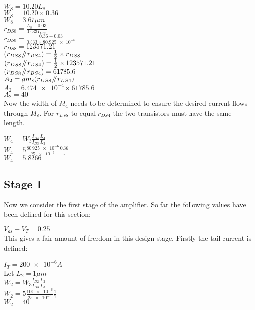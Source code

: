 $W_{8} = 10.20L_{8}$ \\
$W_{8} = 10.20 \times 0.36$ \\
$W_{8} = 3.67\mu m$ \\

$r_{DS8} = \frac{L_{8} - 0.03}{0.033I_{DS8}}$ \\
$r_{DS8} = \frac{0.36 - 0.03}{0.033 \times \num{80.925e-6}}$ \\
$r_{DS8} = 123571.21$ \\

$(r_{DS8} \mathbin{\!/\mkern-5mu/\!} r_{DS4}) = \frac{1}{2} \times r_{DS8}$ \\
$(r_{DS8} \mathbin{\!/\mkern-5mu/\!} r_{DS4}) = \frac{1}{2} \times 123571.21$ \\
$(r_{DS8} \mathbin{\!/\mkern-5mu/\!} r_{DS4}) = 61785.6$ \\

$A_{2} = gm_{8}(r_{DS8} \mathbin{\!/\mkern-5mu/\!} r_{DS4})$ \\
$A_{2} = \num{6.474e-4} \times 61785.6$ \\
$A_{2} = 40$ \\

Now the width of $M_{4}$ needs to be determined to ensure the desired current flows through $M_{8}$.
For $r_{DS8}$ to equal $r_{DS4}$ the two transistors must have the same length.

$W_{4} = W_{3}\frac{I_{D4}}{I_{D3}}\frac{L_{4}}{L_{3}}$ \\
$W_{4} = 5\frac{\num{80.925e-6}}{\num{25e-6}}\frac{0.36}{1}$ \\
$W_{4} = 5.8266$ \\

\subsection{Stage 1}
Now we consider the first stage of the amplifier.
So far the following values have been defined for this section:

$V_{gs} - V_{T} = 0.25$ \\

This gives a fair amount of freedom in this design stage.
Firstly the tail current is defined:

$I_{T} = \num{200e-6}A$ \\

Let $L_{2} = 1\mu m$ \\

$W_{2} = W_{3}\frac{I_{D2}}{I_{D3}}\frac{L_{2}}{L_{3}}$ \\
$W_{2} = 5\frac{\num{100e-6}}{\num{25e-6}}\frac{1}{1}$ \\
$W_{2} = 40$ \\

